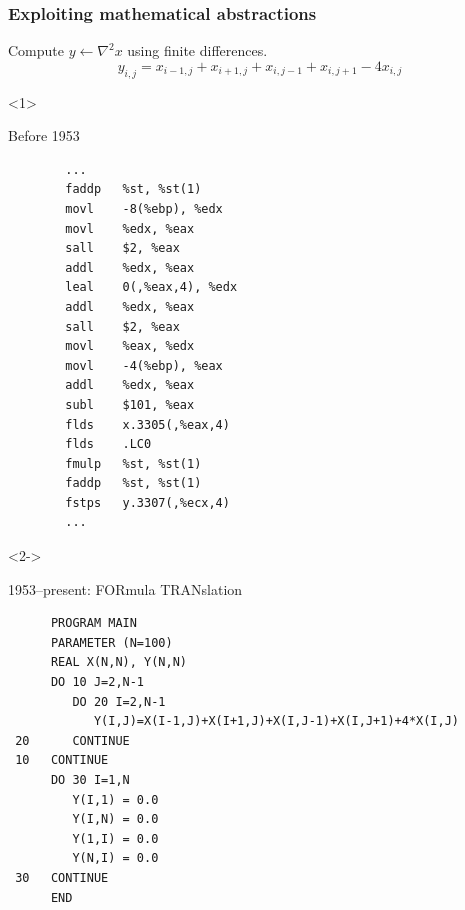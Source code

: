 \documentclass[presentation]{beamer}
\begin{document}
\begin{frame}[fragile]
  \frametitle{Exploiting mathematical abstractions}
  Compute $y \leftarrow \nabla^2 x$ using finite differences.
  \begin{equation*}
    y_{i,j} = x_{i-1, j} + x_{i+1, j} + x_{i, j-1} + x_{i, j+1} - 4x_{i,j}    
  \end{equation*}
  \begin{overlayarea}{\textwidth}{0.8\textheight}
  \begin{onlyenv}<1>
    \begin{block}{Before 1953}
\begin{verbatim}
        ...
        faddp   %st, %st(1)
        movl    -8(%ebp), %edx
        movl    %edx, %eax
        sall    $2, %eax
        addl    %edx, %eax
        leal    0(,%eax,4), %edx
        addl    %edx, %eax
        sall    $2, %eax
        movl    %eax, %edx
        movl    -4(%ebp), %eax
        addl    %edx, %eax
        subl    $101, %eax
        flds    x.3305(,%eax,4)
        flds    .LC0
        fmulp   %st, %st(1)
        faddp   %st, %st(1)
        fstps   y.3307(,%ecx,4)
        ...
\end{verbatim}
    \end{block}
  \end{onlyenv}
  \begin{onlyenv}<2->
    \begin{block}{1953--present: FORmula TRANslation}
\begin{verbatim}
      PROGRAM MAIN
      PARAMETER (N=100)
      REAL X(N,N), Y(N,N)
      DO 10 J=2,N-1
         DO 20 I=2,N-1
            Y(I,J)=X(I-1,J)+X(I+1,J)+X(I,J-1)+X(I,J+1)+4*X(I,J)
 20      CONTINUE
 10   CONTINUE
      DO 30 I=1,N
         Y(I,1) = 0.0
         Y(I,N) = 0.0
         Y(1,I) = 0.0
         Y(N,I) = 0.0
 30   CONTINUE
      END
\end{verbatim}
    \end{block}
  \end{onlyenv}
  \end{overlayarea}
\end{frame}
\end{document}
